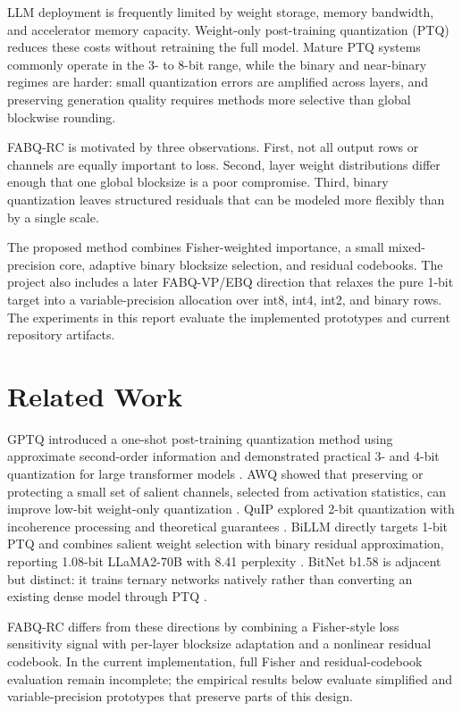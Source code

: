 \documentclass[11pt]{article}
\begin{document}
LLM deployment is frequently limited by weight storage, memory bandwidth, and accelerator memory capacity. Weight-only post-training quantization (PTQ) reduces these costs without retraining the full model. Mature PTQ systems commonly operate in the 3- to 8-bit range, while the binary and near-binary regimes are harder: small quantization errors are amplified across layers, and preserving generation quality requires methods more selective than global blockwise rounding.

FABQ-RC is motivated by three observations. First, not all output rows or channels are equally important to loss. Second, layer weight distributions differ enough that one global blocksize is a poor compromise. Third, binary quantization leaves structured residuals that can be modeled more flexibly than by a single scale.

The proposed method combines Fisher-weighted importance, a small mixed-precision core, adaptive binary blocksize selection, and residual codebooks. The project also includes a later FABQ-VP/EBQ direction that relaxes the pure 1-bit target into a variable-precision allocation over int8, int4, int2, and binary rows. The experiments in this report evaluate the implemented prototypes and current repository artifacts.

\section{Related Work}

GPTQ introduced a one-shot post-training quantization method using approximate second-order information and demonstrated practical 3- and 4-bit quantization for large transformer models \cite{gptq}. AWQ showed that preserving or protecting a small set of salient channels, selected from activation statistics, can improve low-bit weight-only quantization \cite{awq}. QuIP explored 2-bit quantization with incoherence processing and theoretical guarantees \cite{quip}. BiLLM directly targets 1-bit PTQ and combines salient weight selection with binary residual approximation, reporting 1.08-bit LLaMA2-70B with 8.41 perplexity \cite{billm}. BitNet b1.58 is adjacent but distinct: it trains ternary networks natively rather than converting an existing dense model through PTQ \cite{bitnet}.

FABQ-RC differs from these directions by combining a Fisher-style loss sensitivity signal with per-layer blocksize adaptation and a nonlinear residual codebook. In the current implementation, full Fisher and residual-codebook evaluation remain incomplete; the empirical results below evaluate simplified and variable-precision prototypes that preserve parts of this design.
\end{document}
